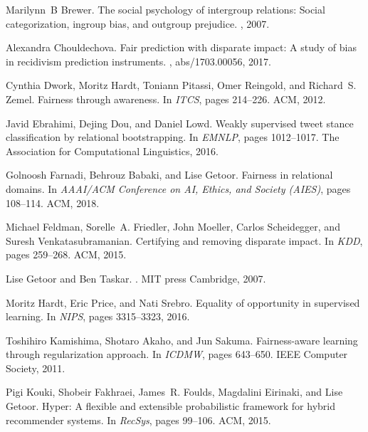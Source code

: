 \documentclass[11pt]{article}
\begin{document}
\begin{thebibliography}{10}
\begin{small}
Marilynn~B Brewer.
\newblock The social psychology of intergroup relations: Social categorization,
  ingroup bias, and outgroup prejudice.
, 2007.

Alexandra Chouldechova.
\newblock Fair prediction with disparate impact: {A} study of bias in
  recidivism prediction instruments.
, abs/1703.00056, 2017.

Cynthia Dwork, Moritz Hardt, Toniann Pitassi, Omer Reingold, and Richard~S.
  Zemel.
\newblock Fairness through awareness.
\newblock In {\em {ITCS}}, pages 214--226. {ACM}, 2012.

Javid Ebrahimi, Dejing Dou, and Daniel Lowd.
\newblock Weakly supervised tweet stance classification by relational
  bootstrapping.
\newblock In {\em {EMNLP}}, pages 1012--1017. The Association for Computational
  Linguistics, 2016.

Golnoosh Farnadi, Behrouz Babaki, and Lise Getoor.
\newblock Fairness in relational domains.
\newblock In {\em AAAI/ACM Conference on AI, Ethics, and Society (AIES)}, pages
  108--114. ACM, 2018.

Michael Feldman, Sorelle~A. Friedler, John Moeller, Carlos Scheidegger, and
  Suresh Venkatasubramanian.
\newblock Certifying and removing disparate impact.
\newblock In {\em {KDD}}, pages 259--268. {ACM}, 2015.

Lise Getoor and Ben Taskar.
.
\newblock MIT press Cambridge, 2007.

Moritz Hardt, Eric Price, and Nati Srebro.
\newblock Equality of opportunity in supervised learning.
\newblock In {\em {NIPS}}, pages 3315--3323, 2016.

Toshihiro Kamishima, Shotaro Akaho, and Jun Sakuma.
\newblock Fairness-aware learning through regularization approach.
\newblock In {\em ICDMW}, pages 643--650. {IEEE} Computer Society, 2011.

Pigi Kouki, Shobeir Fakhraei, James~R. Foulds, Magdalini Eirinaki, and Lise
  Getoor.
\newblock Hyper: {A} flexible and extensible probabilistic framework for hybrid
  recommender systems.
\newblock In {\em RecSys}, pages 99--106. {ACM}, 2015.


\end{small}
\end{thebibliography}
\end{document}
